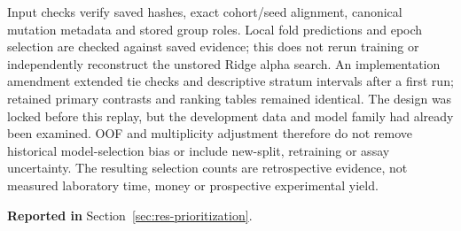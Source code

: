Input checks verify saved hashes, exact cohort/seed alignment, canonical mutation metadata and
stored group roles. Local fold predictions and epoch selection are checked against saved evidence;
this does not rerun training or independently reconstruct the unstored Ridge alpha search.
An implementation amendment extended tie checks and descriptive stratum intervals after a first
run; retained primary contrasts and ranking tables remained identical. The design was locked
before this replay, but the development data and model family had already been examined.
OOF and multiplicity adjustment therefore do not remove historical model-selection bias or
include new-split, retraining or assay uncertainty. The resulting selection counts are retrospective
evidence, not measured laboratory time, money or prospective experimental yield.

\textbf{Reported in} Section~\ref{sec:res-prioritization}.
